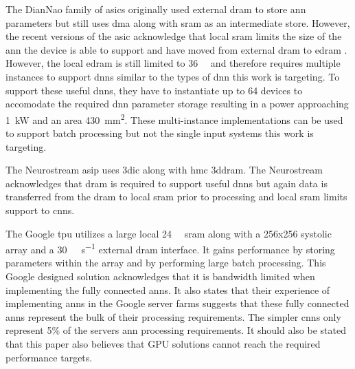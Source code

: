 {{{The DianNao family of \acp{asic} \cite{chen2014diannao} \cite{chen2016diannao} originally used external \ac{dram} to store \ac{ann} parameters but still uses \ac{dma} along with \ac{sram} as an intermediate store.
However, the recent versions of the \ac{asic} acknowledge that local \ac{sram} limits the size of the \ac{ann} the device is able to support and have moved from external \ac{dram} to \ac{edram} \cite{dadiannao2017}.
However, the local \ac{edram} is still limited to \SI[per-mode=symbol]{36}{\mega \byte} and therefore requires multiple instances to support \acp{dnn} similar to the types of \ac{dnn} this work is targeting.
To support these useful \acp{dnn}, they have to instantiate up to 64 devices to accomodate the required \ac{dnn} parameter storage resulting in a power approaching \SI[per-mode=symbol]{1}{\kilo\watt} and an area \SI[per-mode=symbol]{430}{\mm\squared}.
These multi-instance implementations can be used to support batch processing \cite{dadiannao2017} but not the single input systems this work is targeting.

The Neurostream \ac{asip} uses \ac{3dic} along with \ac{hmc} \ac{3ddram}. 
The Neurostream acknowledges that \ac{dram} is required to support useful \acp{dnn} but again data is transferred from the \ac{dram} to local \ac{sram} prior to processing and local \ac{sram} limits support to \acp{cnn}.

The Google \ac{tpu} \cite{tensorflow2015-whitepaper} utilizes a large local \SI[per-mode=symbol]{24}{\mega \byte} \ac{sram} along with a 256x256 systolic array and a \SI[per-mode=symbol]{30}{\giga \byte\per\second} external \ac{dram} interface.
It gains performance by storing parameters within the array and by performing large batch processing.
This Google designed solution acknowledges that it is bandwidth limited when implementing the fully connected \acp{ann}.
It also states that their experience of implementing \acp{ann} in the Google server farms suggests that these fully connected \acp{ann} represent the bulk of their processing requirements.
The simpler \acp{cnn} only represent 5\% of the servers \ac{ann} processing requirements.
It should also be stated that this paper also believes that GPU solutions cannot reach the required performance targets.

\iffalse
Unlike the current state-of-the-art, this work focuses on processing data as it read out of the \ac{dram} thus avoiding requiring excessive \ac{sram}.
in the \acp{pe} thus allowing optimum logic assignment to the processing functions.
\fi

}}}

